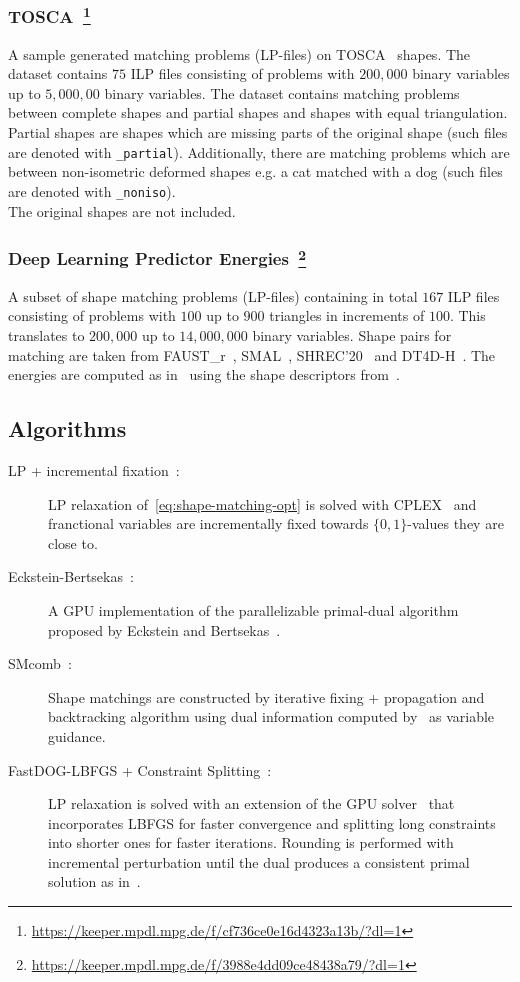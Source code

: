 \subsubsection[TOSCA]{TOSCA~\footnote{\url{https://keeper.mpdl.mpg.de/f/cf736ce0e16d4323a13b/?dl=1}}}
A sample generated matching problems (LP-files) on TOSCA~\cite{bronstein2008} shapes. 
The dataset contains $75$ ILP files consisting of problems with $200,000$ binary variables up to $5,000,00$ binary variables.
The dataset contains matching problems between complete shapes and partial shapes and shapes with equal triangulation. Partial shapes are shapes which are missing parts of the original shape (such files are denoted with \texttt{\_partial}). Additionally, there are matching problems which are between non-isometric deformed shapes e.g. a cat matched with a dog (such files are denoted with \texttt{\_noniso}).
\\
The original shapes are not included.
\subsubsection[Deep Learning Predictor Energies]{Deep Learning Predictor Energies~\footnote{\url{https://keeper.mpdl.mpg.de/f/3988e4dd09ce48438a79/?dl=1}}}
A subset of shape matching problems (LP-files) containing in total $167$ ILP files consisting of problems with $100$ up to $900$ triangles in increments of $100$. This translates to $200,000$ up to $14,000,000$ binary variables.
Shape pairs for matching are taken from FAUST\_r~\cite{ren2018continuous,donati2020deep}, SMAL~\cite{zuffi20173d}, SHREC’20~\cite{dyke2020track} and DT4D-H~\cite{magnet2022smooth}. The energies are computed as in~\cite{roetzer2023fast} using the shape descriptors from~\cite{cao2023unsupervised}.

\subsection{Algorithms}
\begin{description}	
	\item[LP + incremental fixation~\cite{windheuser2011geometrically}:]
	LP relaxation of~\eqref{eq:shape-matching-opt} is solved with CPLEX~\cite{cplex} and franctional variables are incrementally fixed towards $\{0,1\}$-values they are close to.
	\item[Eckstein-Bertsekas~\cite{windheuser2011large}:]
	A GPU implementation of the parallelizable primal-dual algorithm proposed by Eckstein and Bertsekas~\cite{eckstein1990alternating}.
\item[SMcomb~\cite{roetzer2022scalable}:] Shape matchings are constructed by iterative fixing + propagation and backtracking algorithm using dual information computed by~\cite{lange2021efficient} as variable guidance.
    \item[FastDOG-LBFGS + Constraint Splitting~\cite{roetzer2023fast}:]
        LP relaxation is solved with an extension of the GPU solver~\cite{abbas2022fastdog} that incorporates LBFGS for faster convergence and splitting long constraints into shorter ones for faster iterations. Rounding is performed with incremental perturbation until the dual produces a consistent primal solution as in~\cite{abbas2022fastdog}.
\end{description}
